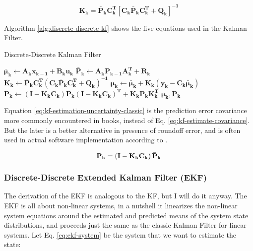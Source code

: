 \documentclass[12pt]{article}
\newcommand{\bvec}[1]{\boldsymbol{\mathbf{#1}}} %
\newcommand{\mat}[1]{\boldsymbol{\mathbf{#1}}}
\newcommand{\matT}[1]{\boldsymbol{\mathbf{#1^T}}}
\newcommand{\brac}[1]{\left[#1\right]} %
\newcommand{\parentheses}[1]{\left(#1\right)}
\newcommand{\mb}[1]{{\boldsymbol{#1}}} %
\begin{document}
\begin{equation}
    \mat{K_k} = \mat{\bar{P}_k}\matT{C_k} \brac{\mat{C_k}\mat{\bar{P}_k}\matT{C_k} + \mat{Q_k}}^\mathbf{-1}
    \label{eq:kf-gain}
\end{equation}

Algorithm \ref{alg:discrete-discrete-kf} shows the five equations used in the Kalman Filter.
\begin{algorithm}[h]
\caption{Discrete-Discrete Kalman Filter}
\label{alg:discrete-discrete-kf}
\begin{algorithmic}[1]
\Procedure{Kalman Filter}{$\mb{\mu}_\mathbf{k-1}, \mat{P_{k-1}}, \bvec{u_k}, \bvec{y_k}$}
\State $\mb{\bar{\mu}}_\mathbf{k} \gets \mat{A_k}\bvec{x_{k-1}} + \mat{B_k}\bvec{u_k}$ 
\State $\mat{\bar{P}_k} \gets \mat{A_k P_{k-1} A^T_k + R_k}$ 
\State $\mat{K_k} \gets \mat{\bar{P}_k C^T_k \parentheses{C_k \bar{P}_k C^T_k + Q_k}^{-1}}$ 
\State $\mb{\mu}_\mathbf{k} \gets \mb{\bar{\mu}}_\mathbf{k} + \mat{K_k} \parentheses{\bvec{y_k} - \mat{C_k}\mb{\bar{\mu}}_\mathbf{k}}$ 
\State $\mat{P_k} \gets \parentheses{\mat{I} - \mat{K_k C_k}}\mat{\bar{P}_k} \parentheses{\mat{I} - \mat{K_k C_k}}^\mathbf{T} + \mat{K_k P_k K_k^T}$ 
\State \Return $\mb{\mu}_\mathbf{k}, \mat{P_k}$
\EndProcedure
\end{algorithmic}
\end{algorithm}

Equation \ref{eq:kf-estimation-uncertainty-classic} is the prediction error covariance more commonly encountered in books, instead of Eq. \ref{eq:kf-estimate-covariance}. But the later is a better alternative in presence of roundoff error, and is often used in actual software implementation according to \cite[p.~ 73]{lewis2017optimal}.

\begin{equation}
    \mat{P_k} = \parentheses{\mat{I} - \mat{K_k C_k}}\mat{\Bar{P}_k}
    \label{eq:kf-estimation-uncertainty-classic}
\end{equation}

\subsubsection{Discrete-Discrete Extended Kalman Filter (EKF)}
The derivation of the EKF is analogous to the KF, but I will do it anyway. The EKF is all about non-linear systems, in a nutshell it linearizes the non-linear system equations around the estimated and predicted means of the system state distributions, and proceeds just the same as the classic Kalman Filter for linear systems.
Let Eq. \ref{eq:ekf-system} be the system that we want to estimate the state:
\end{document}
